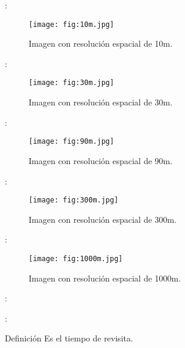 
\begin{frame}{\secname : \subsecname}
    \begin{figure}[h!]
        \centering
        \texttt{[image: fig:10m.jpg]}
        \caption{Imagen con resolución espacial de 10m.}
    \end{figure}
\end{frame}

\begin{frame}{\secname : \subsecname}
    \begin{figure}[h!]
        \centering
        \texttt{[image: fig:30m.jpg]}
        \caption{Imagen con resolución espacial de 30m.}
    \end{figure}
\end{frame}

\begin{frame}{\secname : \subsecname}
    \begin{figure}[h!]
        \centering
        \texttt{[image: fig:90m.jpg]}
        \caption{Imagen con resolución espacial de 90m.}
    \end{figure}
\end{frame}

\begin{frame}{\secname : \subsecname}
    \begin{figure}[h!]
        \centering
        \texttt{[image: fig:300m.jpg]}
        \caption{Imagen con resolución espacial de 300m.}
    \end{figure}
\end{frame}

\begin{frame}{\secname : \subsecname}
    \begin{figure}[h!]
        \centering
        \texttt{[image: fig:1000m.jpg]}
        \caption{Imagen con resolución espacial de 1000m.}
    \end{figure}
\end{frame}
\begin{frame}{\secname : \subsecname}

\end{frame}

\begin{frame}{\secname : \subsecname}
    \begin{block}{Definición}
        Es el tiempo de revisita.
    \end{block}
\end{frame}


